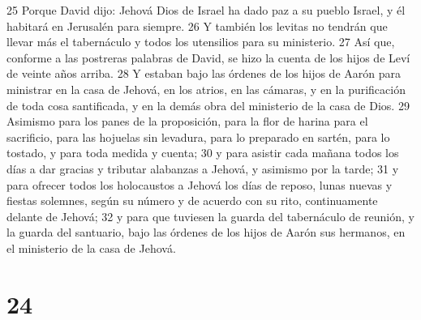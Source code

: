 25 Porque David dijo: Jehová Dios de Israel ha dado paz a su pueblo Israel, y él habitará en Jerusalén para siempre.
26 Y también los levitas no tendrán que llevar más el tabernáculo y todos los utensilios para su ministerio. 
27 Así que, conforme a las postreras palabras de David, se hizo la cuenta de los hijos de Leví de veinte años arriba.
28 Y estaban bajo las órdenes de los hijos de Aarón para ministrar en la casa de Jehová, en los atrios, en las cámaras, y en la purificación de toda cosa santificada, y en la demás obra del ministerio de la casa de Dios.
29 Asimismo para los panes de la proposición, para la flor de harina para el sacrificio, para las hojuelas sin levadura, para lo preparado en sartén, para lo tostado, y para toda medida y cuenta;
30 y para asistir cada mañana todos los días a dar gracias y tributar alabanzas a Jehová, y asimismo por la tarde;
31 y para ofrecer todos los holocaustos a Jehová los días de reposo, lunas nuevas y fiestas solemnes, según su número y de acuerdo con su rito, continuamente delante de Jehová;
32 y para que tuviesen la guarda del tabernáculo de reunión, y la guarda del santuario, bajo las órdenes de los hijos de Aarón sus hermanos, en el ministerio de la casa de Jehová. 

\chapter{24}


